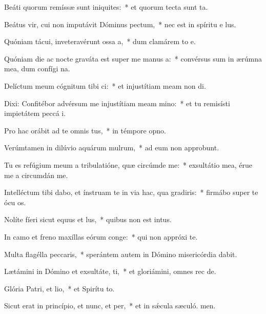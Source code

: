 \item Beáti quorum remíssæ sunt iniquites:~* et quorum tecta sunt ta.
\item Beátus vir, cui non imputávit Dóminus pectum,~* nec est in spíritu e lus.
\item Quóniam tácui, inveteravérunt ossa a,~* dum clamárem to e.
\item Quóniam die ac nocte graváta est super me manus a:~* convérsus sum in ærúmna mea, dum confígi na.
\item Delíctum meum cógnitum tibi ci:~* et injustítiam meam non di.
\item Dixi: Confitébor advérsum me injustítiam meam mino:~* et tu remisísti impietátem peccá i.
\item Pro hac orábit ad te omnis tus,~* in témpore opno.
\item Verúmtamen in dilúvio aquárum mulrum,~* ad eum non approbunt.
\item Tu es refúgium meum a tribulatióne, quæ circúmde me:~* exsultátio mea, érue me a circumdán me.
\item Intelléctum tibi dabo, et ínstruam te in via hac, qua gradiris:~* firmábo super te ócu os.
\item Nolíte fíeri sicut equus et lus,~* quibus non est intus.
\item In camo et freno maxíllas eórum conge:~* qui non appróxi  te.
\item Multa flagélla peccaris,~* sperántem autem in Dómino misericórdia dabit.
\item Lætámini in Dómino et exsultáte, ti,~* et gloriámini, omnes rec de.
\item Glória Patri, et lio,~* et Spirítu to.
\item Sicut erat in princípio, et nunc, et per,~* et in sǽcula sæculó. men.
